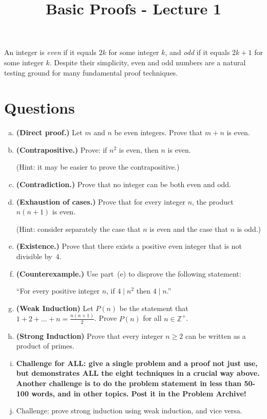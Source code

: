 \documentclass[12pt]{article}
\title{Basic Proofs - Lecture 1}
\author{}
\date{}
\begin{document}
\maketitle

An integer is \textit{even} if it equals $2k$ for some integer $k$,
and \textit{odd} if it equals $2k+1$ for some integer $k$.
Despite their simplicity, even and odd numbers are a natural
testing ground for many fundamental proof techniques.

\section*{Questions}

\begin{enumerate}[(a)]

\item \textbf{(Direct proof.)}
Let $m$ and $n$ be even integers.
Prove that $m + n$ is even.

\item \textbf{(Contrapositive.)}
Prove: if\/ $n^2$ is even, then $n$ is even.

\noindent
(Hint: it may be easier to prove the contrapositive.)

\item \textbf{(Contradiction.)}
Prove that no integer can be both even and odd.

\item \textbf{(Exhaustion of cases.)}
Prove that for every integer $n$, the product $n(n+1)$ is even.

\noindent
(Hint: consider separately the case that $n$ is even
and the case that $n$ is odd.)

\item \textbf{(Existence.)}
Prove that there exists a positive even integer that is not divisible
by~$4$.

\item \textbf{(Counterexample.)}
Use part~(e) to disprove the following statement:

\begin{center}
``For every positive integer $n$,
if\/ $4 \mid n^2$ then $4 \mid n$.''
\end{center}

\item \textbf{(Weak Induction)}
Let $P(n)$ be the statement that $1 + 2 + \dots + n = \frac{n(n+1)}{2}$. 
Prove $P(n)$ for all $n \in \mathbb{Z}^+$.

\item \textbf{(Strong Induction)}
Prove that every integer $n \geq 2$ can be written as a product of primes.

\item \textbf{Challenge for ALL: give a single
problem and a proof not just use, but demonstrates ALL the eight techniques in a crucial way above. 
Another challenge is to do the problem statement in less than 50-100 words, and in other topics.
Post it in the Problem Archive!}

\item Challenge: prove strong induction using weak induction, and vice versa.

\end{enumerate}
\end{document}
